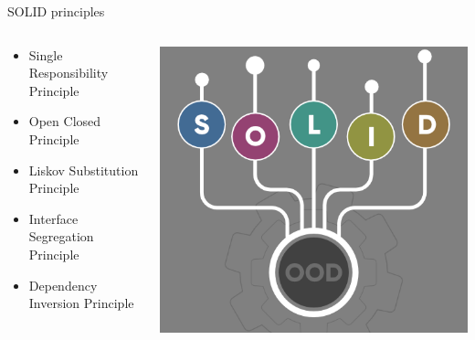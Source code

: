\documentclass[13pt]{beamer}
\begin{document}
\begin{frame}{SOLID principles}
\begin{columns}[T]
\begin{column}{.5\textwidth}                                               
	\begin{itemize}
		\setlength\itemsep{2em}
		\item Single Responsibility Principle \\ 
		\item Open Closed Principle \\
		\item Liskov Substitution Principle \\
		\item Interface Segregation Principle \\
		\item Dependency Inversion Principle
	\end{itemize}                                
\end{column}

\begin{column}{.5\textwidth}                                              
	\includegraphics[scale=1]{solid.png}
\end{column}%
\end{columns}
\end{frame}
\end{document}
